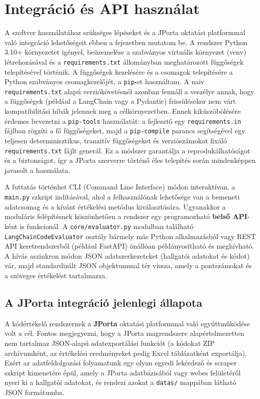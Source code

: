 \documentclass[12pt,a4paper]{article}
\begin{document}
\section{Integráció és API használat}
\label{sec:integracio}
A szoftver használatához szükséges lépéseket és a JPorta oktatási platformmal való integráció lehetőségeit ebben a fejezetben mutatom be. A rendszer Python 3.10+ környezetet igényel, beüzemelése a szabványos virtuális környezet (venv) létrehozásával és a \texttt{requirements.txt} állományban meghatározott függőségek telepítésével történik. A függőségek kezelésére és a csomagok telepítésére a Python szabványos csomagkezelőjét, a \texttt{pip}-et használtam. A naiv \texttt{requirements.txt} alapú verziókövetésnél azonban fennáll a veszélye annak, hogy a függőségek (például a LangChain vagy a Pydantic) frissülésekor nem várt kompatibilitási hibák jelennek meg a célkörnyezetben. Ennek kiküszöbölésére érdemes bevezetni a \texttt{pip-tools} használatát: a fejlesztő egy \texttt{requirements.in} fájlban rögzíti a fő függőségeket, majd a \texttt{pip-compile} parancs segítségével egy teljesen determinisztikus, tranzitív függőségeket és verziószámokat fixáló \texttt{requirements.txt} fájlt generál. Ez a módszer garantálja a reprodukálhatóságot és a biztonságot, így a JPorta szerverre történő éles telepítés során mindenképpen javasolt a használata.

A futtatás történhet CLI (Command Line Interface) módon interaktívan, a \texttt{main.py} szkript indításával, ahol a felhasználónak lehetősége van a bemeneti adatcsomag és a kívánt értékelési metódus kiválasztására. Ugyanakkor a moduláris felépítésnek köszönhetően a rendszer egy programozható \textbf{belső API}-ként is funkcionál. A \texttt{core/evaluator.py} modulban található \texttt{LangChainCodeEvaluator} osztály bármely más Python alkalmazásból vagy REST API keretrendszerből (például FastAPI) önállóan példányosítható és meghívható. A hívás aszinkron módon JSON adatszerkezeteket (hallgatói adatokat és kódot) vár, majd standardizált JSON objektummal tér vissza, amely a pontszámokat és a szöveges értékelést tartalmazza.

\subsection{A JPorta integráció jelenlegi állapota}
A kódértékelő rendszernek a \textbf{JPorta} oktatási platformmal való együttműködése volt a cél. Fontos megjegyezni, hogy a JPorta magrendszere alapértelmezetten nem tartalmaz JSON-alapú adatexportálási funkciót (a kódokat ZIP archívumként, az értékelési eredményeket pedig Excel táblázatként exportálja). Ezért az adatfeldolgozási folyamatunk egy olyan egyedi lekérdező és scraper szkript kimenetére épül, amely a JPorta adatbázisából vagy webes felületéről nyeri ki a hallgatói adatokat, és rendezi azokat a \texttt{datas/} mappában látható JSON formátumba. 
\end{document}
